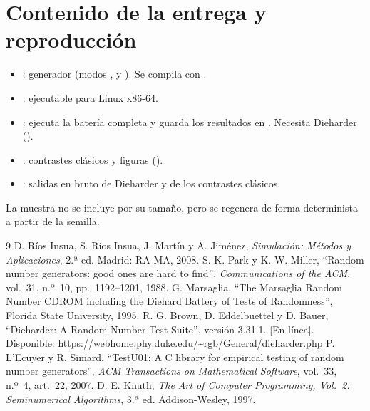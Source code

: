 \documentclass[a4paper,11pt]{article}
\begin{document}
\appendix
\section{Contenido de la entrega y reproducción}

\begin{itemize}
  \item {}: generador (modos ,  y ).
        Se compila con .
  \item {}: ejecutable para Linux x86-64.
  \item {}: ejecuta la batería completa y guarda los
        resultados en . Necesita Dieharder
        ().
  \item {}: contrastes clásicos y figuras
        ().
  \item {}: salidas en bruto de Dieharder y de los contrastes
        clásicos.
\end{itemize}
La muestra no se incluye por su tamaño, pero se regenera de forma determinista
a partir de la semilla.

\begin{thebibliography}{9}
 D. Ríos Insua, S. Ríos Insua, J. Martín y A. Jiménez,
  \emph{Simulación: Métodos y Aplicaciones}, 2.ª ed. Madrid: RA-MA, 2008.
 S. K. Park y K. W. Miller, \enquote{Random number
  generators: good ones are hard to find}, \emph{Communications of the ACM},
  vol.~31, n.º~10, pp.~1192--1201, 1988.
 G. Marsaglia, \enquote{The Marsaglia Random Number CDROM
  including the Diehard Battery of Tests of Randomness}, Florida State
  University, 1995.
 R. G. Brown, D. Eddelbuettel y D. Bauer,
  \enquote{Dieharder: A Random Number Test Suite}, versión 3.31.1. [En línea].
  Disponible: \url{https://webhome.phy.duke.edu/~rgb/General/dieharder.php}
 P. L'Ecuyer y R. Simard, \enquote{TestU01: A C library for
  empirical testing of random number generators}, \emph{ACM Transactions on
  Mathematical Software}, vol.~33, n.º~4, art.~22, 2007.
 D. E. Knuth, \emph{The Art of Computer Programming, Vol.~2:
  Seminumerical Algorithms}, 3.ª ed. Addison-Wesley, 1997.
\end{thebibliography}
\end{document}
